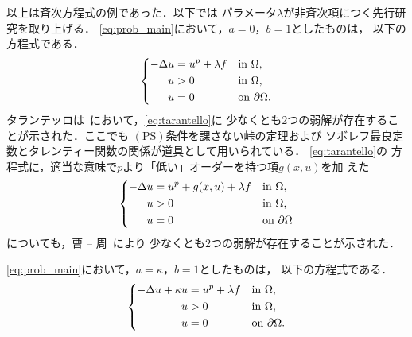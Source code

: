 以上は斉次方程式の例であった．以下では
パラメータ$\lambda$が非斉次項につく先行研究を取り上げる．
\ref{eq:prob_main}において，$a = 0$，$b = 1$としたものは，
以下の方程式である．
\begin{align}
 \left\{
 \begin{aligned}
  -\Delta u &= u^p + \lambda f  & &\text{in}~ \Omega,  \\
  u &> 0 & &\text{in}~ \Omega, \\
  u &= 0 & &\text{on}~ \partial\Omega.
 \end{aligned}
 \right. \label{eq:tarantello}
\end{align}
タランテッロは\cite{MR1168304}~において，\eqref{eq:tarantello}に
少なくとも$2$つの弱解が存在することが示された．ここでも
$(\mathrm{PS})$条件を課さない峠の定理および
ソボレフ最良定数とタレンティー関数の関係が道具として用いられている．
\eqref{eq:tarantello}の
方程式に，適当な意味で$p$より「低い」オーダーを持つ項$g(x, u)$を加
えた
\begin{align}
 \left\{
 \begin{aligned}
  -\Delta u &= u^p + g(x, u) + \lambda f  & &\text{in}~ \Omega,  \\
  u &> 0 & &\text{in}~ \Omega, \\
  u &= 0 & &\text{on}~ \partial\Omega
 \end{aligned}
 \right. \label{eq:tarantello2}
\end{align}
についても，曹 -- 周~\cite{MR1408672}により
少なくとも$2$つの弱解が存在することが示された．

\ref{eq:prob_main}において，$a = \kappa$，$b = 1$としたものは，
以下の方程式である．
\begin{align}
 \left\{
 \begin{aligned}
  -\Delta u + \kappa u &= u^p + \lambda f  & &\text{in}~ \Omega,  \\
  u &> 0 & &\text{in}~ \Omega, \\
  u &= 0 & &\text{on}~ \partial\Omega.
 \end{aligned}
 \right. \label{eq:naito_sato}
\end{align}

